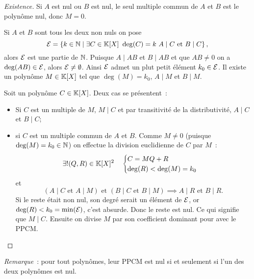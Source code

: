 \begin{proof}[Existence]
  Si \(A\) est nul ou \(B\) est nul, le seul multiple commun de \(A\) et \(B\) 
  est le polynôme nul, donc \(M=0\).

  Si \(A\) et \(B\) sont tous les deux non nuls on pose
  \begin{equation}
    \E=\enstq{k \in \N}{\exists C \in \K[X] \ \deg(C)=k \ A\mid{}C \text{~et~} 
    B\mid{}C},
  \end{equation}
  alors \(\mathcal{E}\) est une partie de \(\mathbb{N}\). Puisque \(A\mid{}AB\) et \(B\mid{}AB\) 
  et que \(AB \neq 0\) on a \(\deg(AB) \in \mathcal{E}\), alors \(\mathcal{E}\neq \emptyset\). 
  Ainsi \(\mathcal{E}\) admet un plut petit élément \(k_0 \in \mathcal{E}\). Il existe un polynôme 
  \(M \in \mathbb{K}[X]\) tel que \(\deg(M)=k_0\), \(A\mid{}M\) et \(B\mid{}M\).

  Soit un polynôme \(C \in \mathbb{K}[X]\). Deux cas se présentent~:
  \begin{itemize}
    \item Si \(C\) est un multiple de \(M\), \(M\mid{}C\) et par transitivité de 
      la distributivité, \(A\mid{}C\) et \(B\mid{}C\);
    \item si \(C\) est un multiple commun de \(A\) et \(B\). Comme \(M \neq 0\) 
      (puisque \(\deg(M)=k_0 \in \mathbb{N}\)) on effectue la division euclidienne de 
      \(C\) par \(M\)~:
      \begin{equation}
        \exists! (Q,R) \in \mathbb{K}[X]^2 \quad \begin{cases} C=MQ+R \\ \deg(R) < 
        \deg(M)=k_0 \end{cases}
      \end{equation}
      et
      \begin{equation}
        (A\mid{}C \text{~et~} A\mid{}M) \text{~et~} (B\mid{}C \text{~et~} 
        B\mid{}M) \implies A\mid{}R \text{~et~} B\mid{}R.
      \end{equation}
      Si le reste était non nul, son degré serait un élément de \(\mathcal{E}\), or 
      \(\deg(R) < k_0 = \min(\mathcal{E})\), c'est absurde. Donc le reste est nul. Ce qui 
      signifie que \(M\mid{}C\). Ensuite on divise \(M\) par son coefficient 
      dominant pour avec le PPCM.
  \end{itemize}
\end{proof}

\emph{Remarque}~: pour tout polynômes, leur PPCM est nul si et seulement si l'un 
des deux polynômes est nul.

